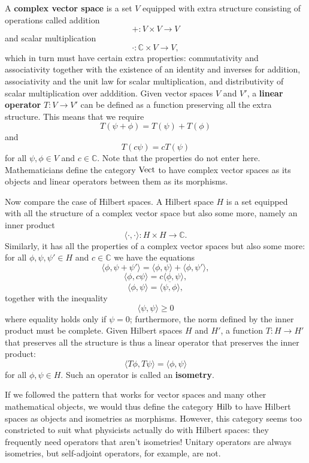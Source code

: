 \documentclass{article}
\newcommand{\Hilb}{{\rm Hilb}}
\newcommand{\Vect}{{\rm Vect}}
\newcommand{\C}{{\mathbb C}}
\renewcommand{\to}{\rightarrow}
\newcommand{\maps}{\colon}
\begin{document}
A {\bf complex vector space} is a set $V$ equipped with 
extra structure consisting of operations called addition
\[              + \maps V \times V \to V  \]
and scalar multiplication
\[              \cdot \maps \C \times V \to V ,\]
which in turn must have certain extra properties: commutativity
and associativity together with the existence of an 
identity and inverses for addition, associativity and the unit law for 
scalar multiplication, and distributivity of scalar multiplication
over adddition.   Given vector spaces $V$ and $V'$, a
{\bf linear operator} $T \maps V \to V'$ can be defined as 
a function preserving all the extra structure.  This means
that we require 
\[     T(\psi + \phi) = T(\psi) + T(\phi) \]
and 
\[        T(c\psi) = c T(\psi)  \]
for all $\psi,\phi \in V$ and $c \in \C$.  Note that the 
properties do not enter here.  Mathematicians
define the category $\Vect$ to have complex vector spaces 
as its objects and linear operators between them as its
morphisms.

Now compare the case of Hilbert spaces.  A Hilbert space $H$
is a set equipped with all the structure of a complex vector
space but also some more, namely an inner product
\[        \langle \cdot, \cdot \rangle \maps H \times H \to \C . \]
Similarly, it has all the properties of a complex vector spaces
but also some more: for all $\phi, \psi, \psi' \in H$
and $c \in \C$ we have the equations
\[    \langle \phi , \psi + \psi' \rangle = 
       \langle \phi, \psi \rangle + \langle \phi, \psi' \rangle, \]
\[   \langle \phi, c\psi \rangle = c \langle \phi, \psi \rangle, \]
\[   \langle \phi,\psi \rangle = \overline{\langle \psi,\phi \rangle},\]
together with the inequality
\[   \langle \psi , \psi \rangle \ge 0 \]
where equality holds only if $\psi = 0$; furthermore, the norm defined
by the inner product must be complete.  
Given Hilbert spaces $H$ and $H'$, a function $T \maps H \to H'$
that preserves all the structure is thus a linear operator that 
preserves the inner product:
\[      \langle T \phi, T \psi \rangle = \langle \phi,\psi \rangle \]
for all $\phi,\psi \in H$.  Such an operator is called an 
{\bf isometry}.    

If we followed the pattern that works for vector spaces 
and many other mathematical objects, we would thus define the
category $\Hilb$ to have Hilbert spaces as objects and 
isometries as morphisms.  However, this category seems
too constricted to suit what physicists actually do
with Hilbert spaces: they frequently need operators
that aren't isometries!   Unitary operators are always 
isometries, but self-adjoint operators, for example, are not.
\end{document}
